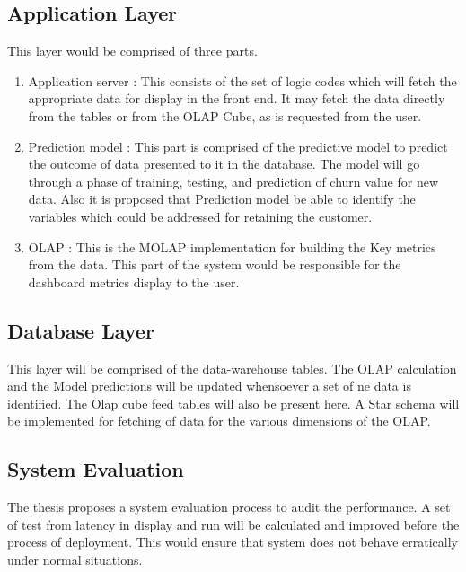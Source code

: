 \subsection{Application Layer}
This layer would be comprised of three parts.
\begin{enumerate}
	\item Application server : This consists of the set of logic codes which will fetch the appropriate data for display in the front end. It may fetch the data directly from the tables or from the OLAP Cube, as is requested from the user.
	\item Prediction model : This part is comprised of the predictive model to predict the outcome of data presented to it in the database. The model will go through a phase of training, testing, and prediction of churn value for new data. Also it is proposed that Prediction model be able to identify the variables which could be addressed for retaining the customer.
	\item OLAP : This is the MOLAP implementation for building the Key metrics from the data. This part of the system would be responsible for the dashboard metrics display to the user.
\end{enumerate}


\subsection{Database Layer}
This layer will be comprised of the data-warehouse tables. The OLAP calculation and the Model predictions will be updated whensoever a set of ne data is identified. The Olap cube feed tables will also be present here. A Star schema will be implemented for fetching of data for the various dimensions of the OLAP.

\subsection{System Evaluation}
The thesis proposes a system evaluation process to audit the performance. A set of test from latency in display and run will be calculated and improved before the process of deployment. This would ensure that system does not behave erratically under normal situations.

